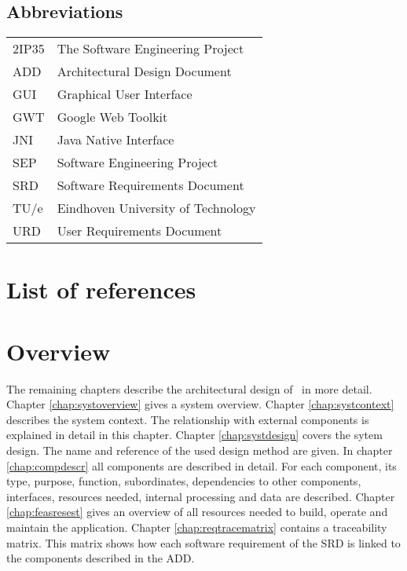 \subsection{Abbreviations}
\begin{tabular}{l|l}
2IP35 & The Software Engineering Project \\
ADD & Architectural Design Document \\
GUI & Graphical User Interface \\
GWT & Google Web Toolkit \\
JNI & Java Native Interface \\
SEP   & Software Engineering Project \\
SRD   & Software Requirements Document \\
TU/e  & Eindhoven University of Technology \\
URD   & User Requirements Document \\
\end{tabular}

\section{List of references}


\section{Overview}
The remaining chapters describe the architectural design of \projectname\ in more detail. Chapter \ref{chap:systoverview} gives a system overview. Chapter \ref{chap:systcontext} describes the system context. The relationship with external components is explained in detail in this chapter. Chapter \ref{chap:systdesign} covers the sytem design. The name and reference of the used design method are given.
In chapter \ref{chap:compdescr} all components are described in detail. For each component, its type, purpose, function, subordinates, dependencies to other components, interfaces, resources needed, internal processing and  data are described. Chapter \ref{chap:feasresest} gives an overview of all resources needed to build, operate and maintain the application. Chapter \ref{chap:reqtracematrix} contains a traceability matrix. This matrix shows how each software requirement of the SRD \cite{srd} is linked to the components described in the ADD.


